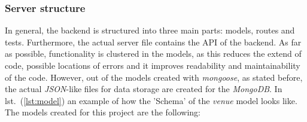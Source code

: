 \subsubsection{Server structure}
\label{subsubsec:serverstructure}
In general, the backend is structured into three main parts: models, routes and tests. Furthermore, the actual server file contains the API of the backend. As far as possible, functionality is clustered in the models, as this reduces the extend of code, possible locations of errors and it improves readability and maintainability of the code. \newline
However, out of the models created with \textit{mongoose}, as stated before, the actual \textit{JSON}-like files for data storage are created for the \textit{MongoDB}. In lst.\ (\ref{lst:model}) an example of how the 'Schema' of the \textit{venue} model looks like. The models created for this project are the following:
